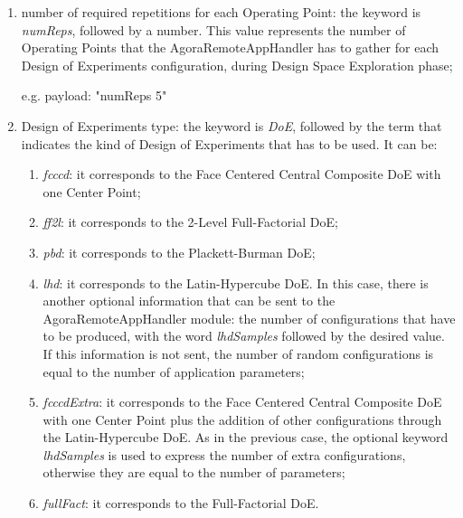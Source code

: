 \begin{enumerate}

    \item number of required repetitions for each Operating Point: the keyword is \textit{numReps}, followed by a number. This value represents the number of Operating Points that the AgoraRemoteAppHandler has to gather for each Design of Experiments configuration, during Design Space Exploration phase;
    
    e.g. payload: "numReps 5"
    
    \item Design of Experiments type: the keyword is \textit{DoE}, followed by the term that indicates the kind of Design of Experiments that has to be used. It can be:
    
    \begin{enumerate}
    
        \item \textit{fcccd}: it corresponds to the Face Centered Central Composite DoE with one Center Point;
        
        \item \textit{ff2l}: it corresponds to the 2-Level Full-Factorial DoE;
        
        \item \textit{pbd}: it corresponds to the Plackett-Burman DoE;
        
        \item \textit{lhd}: it corresponds to the Latin-Hypercube DoE. In this case, there is another optional information that can be sent to the AgoraRemoteAppHandler module: the number of configurations that have to be produced, with the word \textit{lhdSamples} followed by the desired value. If this information is not sent, the number of random configurations is equal to the number of application parameters;
        
        \item \textit{fcccdExtra}: it corresponds to the Face Centered Central Composite DoE with one Center Point plus the addition of other configurations through the Latin-Hypercube DoE. As in the previous case, the optional keyword \textit{lhdSamples} is used to express the number of extra configurations, otherwise they are equal to the number of parameters;
        
        \item \textit{fullFact}: it corresponds to the Full-Factorial DoE.
    
    \end{enumerate}
    

\end{enumerate}
